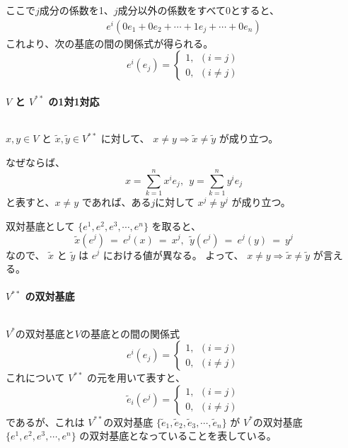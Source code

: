 \documentclass[uplatex,a4j,12pt,dvipdfmx]{jsarticle}
\begin{document}
ここで$j$成分の係数を1、$j$成分以外の係数をすべて0とすると、
\[
	\begin{array}{rcl}
		e^{i} (0 e_{1} + 0 e_{2}  + \cdots + 1 e_{j} + \cdots + 0 e_{n})
	\end{array}
\]
これより、次の基底の間の関係式が得られる。
\[
	e^{i}(e_{j})
	=
	\left\{
	\begin{array}{l}
		1, \ \ (i=j) \\
		0, \ \ (i \neq j)
	\end{array}
	\right.
\]

\paragraph{$V$ と $V^{**}$ の1対1対応}

${}$

$x,y \in V$ と $\tilde{x}, \tilde{y} \in V^{**}$ に対して、
$x \neq y \Rightarrow \tilde{x} \neq \tilde{y}$ が成り立つ。

なぜならば、
$$
	x = \sum_{k=1}^{n} x^{i} e_{j} , \ \
	y = \sum_{k=1}^{n} y^{i} e_{j}
$$
と表すと、$x \neq y$ であれば、ある$j$に対して
$x^{j} \neq y^{j}$ が成り立つ。

双対基底として
$\{ e^{1}, e^{2}, e^{3}, \cdots , e^{n} \}$
を取ると、
$$
	\tilde{x}(e^{j})
	\ = \
	e^{j}(x)
	\ = \
	x^{j}
	, \ \
	\tilde{y}(e^{j})
	\ = \
	e^{j}(y)
	\ = \
	y^{j}
$$
なので、
$\tilde{x}$ と $\tilde{y}$ は $e^{j}$ における値が異なる。
よって、
$x \neq y \Rightarrow \tilde{x} \neq \tilde{y}$
が言える。

\paragraph{$V^{**}$ の双対基底}

${}$

$V^{*}$の双対基底と$V$の基底との間の関係式
\[
	e^{i}(e_{j})
	=
	\left\{
	\begin{array}{l}
		1, \ \ (i=j) \\
		0, \ \ (i \neq j)
	\end{array}
	\right.
\]
これについて $V^{**}$ の元を用いて表すと、
\[
	\tilde{e}_{i}(e^{j})
	=
	\left\{
	\begin{array}{l}
		1, \ \ (i=j) \\
		0, \ \ (i \neq j)
	\end{array}
	\right.
\]
であるが、これは
$V^{**}$の双対基底
$\{ \tilde{e}_{1}, \tilde{e}_{2}, \tilde{e}_{3}, \cdots , \tilde{e}_{n} \}$
が
$V^{*}$の双対基底
$\{ e^{1}, e^{2}, e^{3}, \cdots , e^{n} \}$
の双対基底となっていることを表している。
\end{document}
